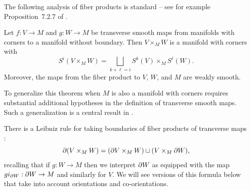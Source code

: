 The following analysis of fiber products is standard -- see for example Proposition~7.2.7 of \cite{MaDo92}.

\begin{theorem} \label{pullback}
	Let $f \colon V \to M$ and $g \colon W \to M$ be transverse smooth maps from manifolds with corners to a manifold without boundary. Then $V \times_M W$ is a manifold with corners with
	\begin{equation*}
	S^i(V \times_M W) = \bigsqcup_{k + \ell = i} S^k(V) \times_M S^\ell(W).
	\end{equation*}
	Moreover, the maps from the fiber product to $V$, $W$, and $M$ are weakly smooth.
\end{theorem}

To generalize this theorem when $M$ is also a manifold with corners requires substantial additional hypotheses in the definition of transverse smooth maps.
Such a generalization is a central result in \cite{Joy12}.

There is a Leibniz rule for taking boundaries of fiber products of transverse maps \cite[Proposition 6.7]{Joy12}:
\begin{equation}\label{E: product boundary}
\partial(V\times_M W)=(\partial V \times_M W)\sqcup (V\times_M \partial W),
\end{equation}
recalling that if $g:W\to M$ then we interpret $\partial W$ as equipped with the map $gi_{\partial W}:\partial W\to M$ and similarly for $V$. We will see versions of this formula below that take into account orientations and co-orientations.


